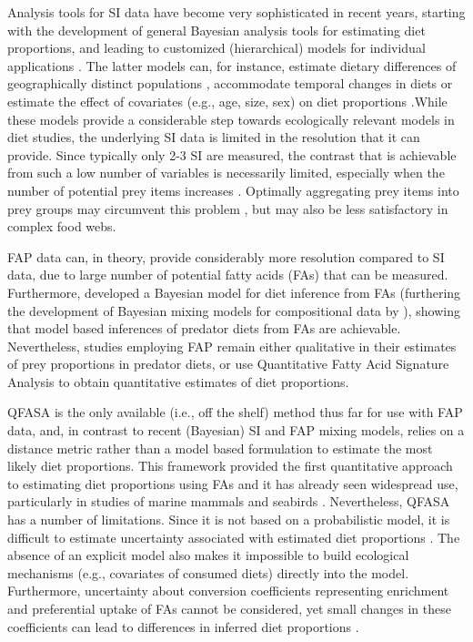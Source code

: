 \documentclass[fleqn,10pt]{wlpeerj}
\begin{document}
Analysis tools for SI data have become very sophisticated in recent
years, starting with the development of general Bayesian analysis
tools for estimating diet proportions, and leading to customized
(hierarchical) models for individual applications \citep{moore_incorporating_2008,hopkins_estimating_2012,parnell_bayesian_2012}. The latter models
can, for instance, estimate dietary differences of geographically
distinct populations \citep{semmens_quantifying_2009}, accommodate temporal
changes in diets or estimate the effect of covariates (e.g., age,
size, sex) on diet proportions \citep{parnell_bayesian_2012}.While these
models provide a considerable step towards ecologically relevant
models in diet studies, the underlying SI data is limited in the
resolution that it can provide. Since typically only 2-3 SI are
measured, the contrast that is achievable from such a low number of
variables is necessarily limited, especially when the number of
potential prey items increases \citep{phillips_source_2003,ward_quantitative_2011}. Optimally aggregating prey items into prey groups may
circumvent this problem \citep{ward_quantitative_2011}, but may also be less
satisfactory in complex food webs.

FAP data can, in theory, provide considerably more resolution compared
to SI data, due to large number of potential fatty acids (FAs) that can be
measured. Furthermore, \citet{blanchard_inference_2011} developed a
Bayesian model for diet inference from FAs (furthering the
development of Bayesian mixing models for compositional data by
\citet{billheimer_compositional_2001}), showing that model based
inferences of predator diets from FAs are
achievable. Nevertheless, studies employing FAP remain either qualitative
in their estimates of prey proportions in predator diets, or use
Quantitative Fatty Acid Signature Analysis \citep[QFASA; ][]{iverson_quantitative_2004} to
obtain quantitative estimates of diet proportions. 

QFASA is the only available (i.e., off the shelf) method thus far for use with FAP data, and, in
contrast to recent (Bayesian) SI and FAP mixing models, relies on a distance
metric rather than a model based formulation to estimate the most
likely diet proportions. This framework provided the first
quantitative approach to estimating diet proportions using FAs
and it has already seen widespread use, particularly in studies of
marine mammals \citep{bowen_methods_2012} and seabirds
\citep{williams_using_2010}. Nevertheless, QFASA has a number of
limitations. Since it is not based on a probabilistic model, it is
difficult to estimate uncertainty associated with estimated diet
proportions \citep[but see Steward 2005 as cited in][]{blanchard_inference_2011}. The absence of an explicit model
also makes it impossible to build ecological mechanisms (e.g.,
covariates of consumed diets) directly into the model. Furthermore,
uncertainty about conversion coefficients representing enrichment and
preferential uptake of FAs cannot be considered, yet small
changes in these coefficients can lead to differences in inferred diet
proportions \citep{wang_validating_2010}.
\end{document}
